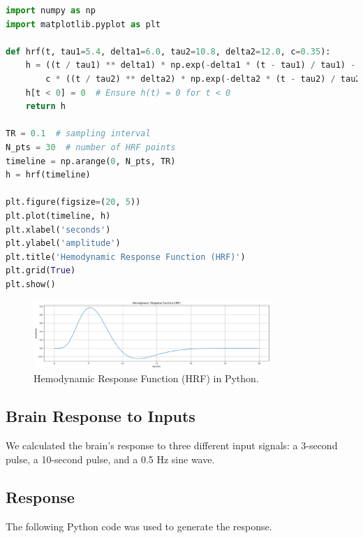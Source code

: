 \documentclass[10pt]{article}
\theoremstyle{definition}
\theoremstyle{remark}
\theoremstyle{definition}
\numberwithin{equation}{prob}
\begin{document}
\begin{lstlisting}[language=Python]
import numpy as np
import matplotlib.pyplot as plt

def hrf(t, tau1=5.4, delta1=6.0, tau2=10.8, delta2=12.0, c=0.35):
    h = ((t / tau1) ** delta1) * np.exp(-delta1 * (t - tau1) / tau1) - \
        c * ((t / tau2) ** delta2) * np.exp(-delta2 * (t - tau2) / tau2)
    h[t < 0] = 0  # Ensure h(t) = 0 for t < 0
    return h

TR = 0.1  # sampling interval
N_pts = 30  # number of HRF points
timeline = np.arange(0, N_pts, TR)
h = hrf(timeline)

plt.figure(figsize=(20, 5))
plt.plot(timeline, h)
plt.xlabel('seconds')
plt.ylabel('amplitude')
plt.title('Hemodynamic Response Function (HRF)')
plt.grid(True)
plt.show()
\end{lstlisting}

\begin{figure}[H]
    \centering
    \includegraphics[width=0.8\textwidth]{./figures/Hemodynamic Response Function (HRF).png}
    \caption{Hemodynamic Response Function (HRF) in Python.}
\end{figure}

\subsection{Brain Response to Inputs}

We calculated the brain’s response to three different input signals: a 3-second pulse, a 10-second pulse, and a 0.5 Hz sine wave.

\subsection*{Response}
The following Python code was used to generate the response.
\end{document}
